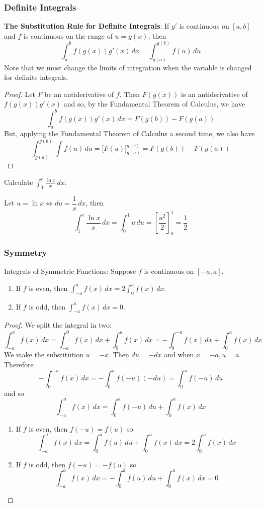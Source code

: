 \subsubsection*{Definite Integrals}
\textbf{The Substitution Rule for Definite Integrals}: If \(g'\) is continuous
on \([a,b]\) and \(f\) is continuous on the range of \(u=g(x)\), then
\[\int_a^b f(g(x))g'(x)\,dx=\int_{g(a)}^{g(b)}f(u)\,du\]
Note that we must change the limits of integration when the variable is
changed for definite integrals.
\begin{proof}
    Let \(F\) be an antiderivative of \(f\).
    Then \(F(g(x))\) is an antiderivative of \(f(g(x))g'(x)\) and so, by the
    Fundamental Theorem of Calculus, we have
    \[\int_a^b f(g(x))g'(x)\,dx=F(g(b))-F(g(a))\]
    But, applying the Fundamental Theorem of Calculus a second time, we also
    have
    \[\int_{g(a)}^{g(b)}\int f(u)\,du=\big[F(u)\big]_{g(a)}^{g(b)}
    =F(g(b))-F(g(a))\]
\end{proof}
\begin{problem}
    Calculate \(\displaystyle{\int_1^e \frac{\ln x}{x}\,dx}\).
\end{problem}
\begin{solution}
    Let \(u=\ln x\iff du=\dfrac{1}{x}\,dx\), then
    \[\int_1^e \frac{\ln x}{x}\,dx=\int_0^1 u\,du
    =\left[\frac{u^2}{2}\right]_0^1=\frac{1}{2}\]
\end{solution}

\subsubsection*{Symmetry}
Integrals of Symmetric Functions: Suppose \(f\) is continuous on \([-a,a]\).
\begin{enumerate}
    \item If \(f\) is even, then
    \(\displaystyle{\int_{-a}^a f(x)\,dx}=2\int_0^a f(x)\,dx\).
    \item If \(f\) is odd, then \(\displaystyle{\int_{-a}^a f(x)\,dx=0}\).
\end{enumerate}
\begin{proof}
    We split the integral in two:
    \[\int_{-a}^a f(x)\,dx=\int_{-a}^0 f(x)\,dx+\int_0^a f(x)\,dx
    =-\int_0^{-a}f(x)\,dx+\int_0^a f(x)\,dx\]
    We make the substitution \(u=-x\).
    Then \(du=-dx\) and when \(x=-a,u=a\).
    Therefore
    \[-\int_0^{-a}f(x)\,dx=-\int_0^a f(-u)(-du)=\int_0^a f(-u)\,du\]
    and so
    \[\int_{-a}^a f(x)\,dx=\int_0^a f(-u)\,du+\int_0^a f(x)\,dx\]
    \begin{enumerate}
        \item If \(f\) is even, then \(f(-u)=f(u)\) so
        \[\int_{-a}^a f(x)\,dx=\int_0^a f(u)\,du+\int_0^a f(x)\,dx
        =2\int_0^a f(x)\,dx\]
        \item If \(f\) is odd, then \(f(-u)=-f(u)\) so
        \[\int_{-a}^a f(x)\,dx=-\int_0^a f(u)\,du+\int_0^a f(x)\,dx=0\]
    \end{enumerate}
\end{proof}